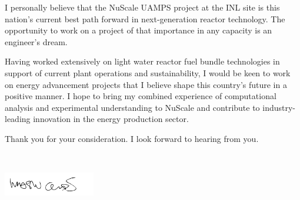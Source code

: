 \documentclass[11pt,letterpaper,roman]{moderncv}        %
\makeatletter
\renewcommand*{\makeletterclosing}{
	\@closing\\[0em]%
	{\includegraphics[width=4cm]{signature_childs}
		\par
		\bfseries \@firstname~\@lastname}%
		\\
	\ifthenelse{\isundefined{\@enclosure}}{}{%
		\vfill%
		{\color{color2}\itshape\enclname: \@enclosure}}}
\makeatother
\begin{document}
I personally believe that the NuScale UAMPS project at the INL site is this nation's current best path forward in next-generation reactor technology. The opportunity to work on a project of that importance in any capacity is an engineer's dream.

Having worked extensively on light water reactor fuel bundle technologies in support of current plant operations and sustainability, I would be keen to work on energy advancement projects that I believe shape this country’s future in a positive manner. I hope to bring my combined experience of computational analysis and experimental understanding to NuScale and contribute to industry-leading innovation in the energy production sector.


Thank you for your consideration. I look forward to hearing from you.

\makeletterclosing
\end{document}
